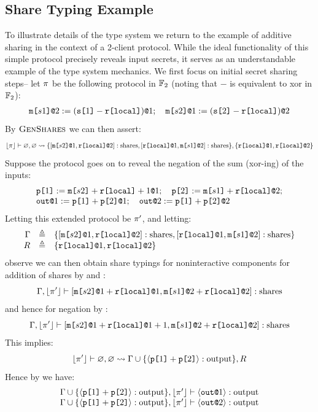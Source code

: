 \subsection{Share Typing Example} To illustrate details of the
type system we return to the example of additive sharing in the context
of a 2-client protocol. While the ideal functionality of this simple protocol
precisely reveals input secrets, it serves as an understandable example
of the type system mechanics.
We first focus on initial secret sharing steps--
let $\prog$ be the following protocol in $\fieldp{2}$ (noting
that $-$ is equivalent to xor in $\fieldp{2}$):
$$
\begin{array}{lll}
  \elab{\mesg{s1}}{2} := \elab{(\secret{1} \fminus \locflip)}{1}; \quad
  \elab{\mesg{s2}}{1} := \elab{(\secret{2} \fminus \locflip)}{2} 
\end{array}
$$
By $\TirName{GenShares}$ we can then assert:
$$
\toeq{\prog} \vdash \varnothing,\varnothing \stredx
\setit{[\mx{s2}{1}, \elab{\locflip}{2}] : \sharety,
  [\elab{\locflip}{1}, \mx{s1}{2}] : \sharety}, \setit{\elab{\locflip}{1},\elab{\locflip}{2}}
$$
Suppose the protocol goes on to reveal the negation of the
sum (xor-ing) of the inputs:
$$
\begin{array}{l}
  \px{1} := \elab{\mesg{s2} + \locflip + 1}{1};\quad \px{2} := \elab{\mesg{s1} + \locflip}{2};\\
  \out{1} := \elab{\px{1} + \px{2}}{1};\quad \out{2} := \elab{\px{1} + \px{2}}{2}
\end{array}
$$
Letting this extended protocol be $\prog'$, and letting:
$$
\begin{array}{rcl}
\Gamma &\defeq& \setit{[\mx{s2}{1}, \elab{\locflip}{2}] : \sharety,
  [\elab{\locflip}{1}, \mx{s1}{2}] : \sharety}\\
R &\defeq&  \setit{\elab{\locflip}{1},\elab{\locflip}{2}}
\end{array}
$$
observe we can then obtain share typings for noninteractive components for
addition of shares by  and :
$$
\Gamma, \toeq{\prog'} \vdash
[\mx{s2}{1} + \elab{\locflip}{1}, \mx{s1}{2} + \elab{\locflip}{2}] : \sharety
$$
and hence for negation by :
$$
\Gamma, \toeq{\prog'} \vdash
[\mx{s2}{1} + \elab{\locflip}{1} + 1, \mx{s1}{2} + \elab{\locflip}{2}] : \sharety
$$
This implies:
$$
\toeq{\prog'} \vdash \varnothing,\varnothing \stredx
\Gamma \cup \setit{\pubx{\px{1} + \px{2}} : \outty}, R 
$$
Hence by  we have:
$$
\begin{array}{l}
\Gamma \cup \setit{\pubx{\px{1} + \px{2}} : \outty}, \toeq{\prog'} \vdash
\pubx{\out{1}} : \outty \\
\Gamma \cup \setit{\pubx{\px{1} + \px{2}} : \outty}, \toeq{\prog'} \vdash
\pubx{\out{2}} : \outty
\end{array}
$$

